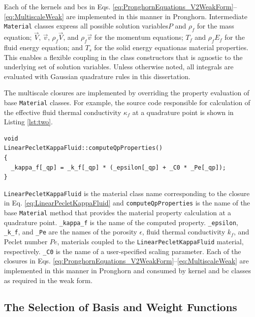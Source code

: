 Each of the kernels and \glspl{bc} in Eqs. \eqref{eq:PronghornEquations_V2WeakForm}--\eqref{eq:MultiscaleWeak} are implemented in this manner in Pronghorn. Intermediate \texttt{Material} classes express all possible solution variables\mdash \(P\) and \(\rho_f\) for the mass equation; \(\vec{V}\), \(\vec{v}\), \(\rho_f\vec{V}\), and \(\rho_f\vec{v}\) for the momentum equations; \(T_f\) and \(\rho_fE_f\) for the fluid energy equation; and \(T_s\) for the solid energy equation\mdash as material properties. This enables a flexible coupling in the class constructors that is agnostic to the underlying set of solution variables. Unless otherwise noted, all integrals are evaluated with Gaussian quadrature rules in this dissertation.

The multiscale closures are implemented by overriding the property evaluation of base \texttt{Material} classes. For example, the source code responsible for calculation of the effective fluid thermal conductivity \(\kappa_f\) at a quadrature point is shown in Listing \ref{lst:two}.

\vspace{1em}
\begin{minipage}[c]{0.92\linewidth}
\begin{lstlisting}[caption={Pronghorn source code evaluation of \(\kappa_f\) by Eq. \eqref{eq:LinearPecletKappaFluid}.}, captionpos=b,label={lst:two}]
void
LinearPecletKappaFluid::computeQpProperties()
{
  _kappa_f[_qp] = _k_f[_qp] * (_epsilon[_qp] + _C0 * _Pe[_qp]);
}
\end{lstlisting}
\end{minipage}

\texttt{LinearPecletKappaFluid} is the material class name corresponding to the closure in Eq. \eqref{eq:LinearPecletKappaFluid} and \texttt{computeQpProperties} is the name of the base \texttt{Material} method that provides the material property calculation at a quadrature point. \texttt{\_kappa\_f} is the name of the computed property. \texttt{\_epsilon}, \texttt{\_k\_f}, and \texttt{\_Pe} are the names of the porosity \(\epsilon\), fluid thermal conductivity \(k_f\), and Peclet number \(Pe\), materials coupled to the \texttt{LinearPecletKappaFluid} material, respectively. \texttt{\_C0} is the name of a user-specified scaling parameter. Each of the closures in Eqs. \eqref{eq:PronghornEquations_V2WeakForm}--\eqref{eq:MultiscaleWeak} are implemented in this manner in Pronghorn and consumed by kernel and \gls{bc} classes as required in the weak form.

\subsection{The Selection of Basis and Weight Functions}
\label{sec:basis}

